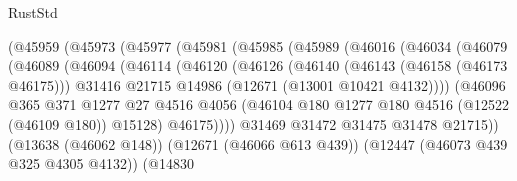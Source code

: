 \begin{lexlean}{RustStd}
\begin{coremodule}
                            (@45959
                              (@45973
                                (@45977
                                  (@45981
                                    (@45985
                                      (@45989
                                        (@46016
                                          (@46034
                                            (@46079
                                              (@46089
                                                (@46094
                                                  (@46114
                                                    (@46120
                                                      (@46126
                                                        (@46140
                                                          (@46143 (@46158 (@46173 @46175)))
                                                          @31416
                                                          @21715
                                                          @14986
                                                          (@12671 (@13001 @10421 @4132))))
                                                      (@46096
                                                        @365
                                                        @371
                                                        @1277
                                                        @27
                                                        @4516
                                                        @4056
                                                        (@46104
                                                          @180
                                                          @1277
                                                          @180
                                                          @4516
                                                          (@12522 (@46109 @180))
                                                          @15128)
                                                        @46175))))
                                                @31469
                                                @31472
                                                @31475
                                                @31478
                                                @21715))
                                            (@13638 (@46062 @148))
                                            (@12671 (@46066 @613 @439))
                                            (@12447 (@46073 @439 @325 @4305 @4132))
                                            (@14830

\end{coremodule}
\end{lexlean}
